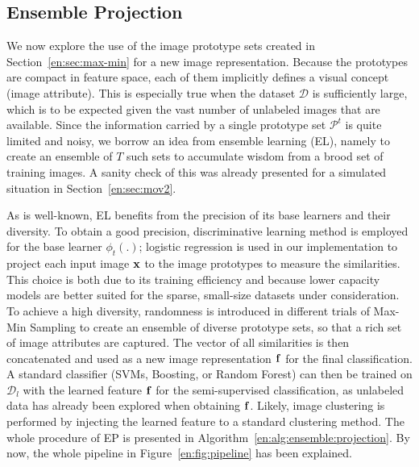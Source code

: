 \subsection{Ensemble Projection}
We now explore the use of the image prototype sets created in
Section~\ref{en:sec:max-min} for a new image representation.  Because the
prototypes are compact in feature space, each of them implicitly
defines a visual concept (image attribute). This is especially true
when the dataset $\mathcal{D}$ is sufficiently large, which is to be
expected given the vast number of unlabeled images that are
available.  Since the information carried by a single prototype set
$\mathcal{P}^t$ is quite limited and noisy, we borrow an idea from
ensemble learning (EL), namely to create an ensemble of $T$ such sets to
accumulate wisdom from a brood set of training images. A sanity check of this was
already presented for a simulated situation in Section~\ref{en:sec:mov2}.

As is well-known, EL benefits from the precision of its base learners
and their diversity.  
To obtain a good precision, discriminative learning method is employed for the
base learner $\phi_t(.)$; logistic regression is used in our
implementation to project each input image ${\mathbf x}$ to the image
prototypes to measure the similarities. This choice is both due to its
training efficiency and because lower capacity models are better suited
for the sparse, small-size datasets under consideration.  To achieve a high
diversity, randomness is introduced in different trials of Max-Min
Sampling to create an ensemble of diverse prototype sets, so that a
rich set of image attributes are captured.
The vector of all similarities is then concatenated and used as a new
image representation ${\mathbf f}$ for the final classification. A
standard classifier (\eg SVMs, Boosting, or Random Forest) can then be
trained on $\mathcal{D}_l$ with the learned feature ${\mathbf f}$ for the
semi-supervised classification, as unlabeled data has already been
explored when obtaining ${\mathbf f}$. Likely, image clustering is
performed by injecting the learned feature to a standard clustering
method.  The whole procedure of EP is presented in
Algorithm~\ref{en:alg:ensemble:projection}.  By now, the whole pipeline in
Figure~\ref{en:fig:pipeline} has been explained.

